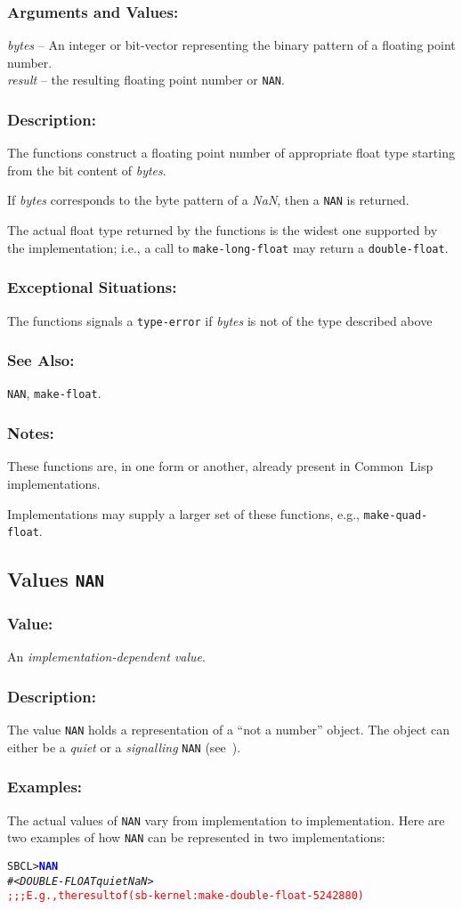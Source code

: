 \documentclass[10pt,fleqn]{article}
\newcommand{\CL}{\textsf{Common~Lisp}}
\newcommand{\code}[1]{\texttt{#1}}
\newcommand{\varname}[1]{\textit{#1}}
\newcommand{\codeprompt}[1]{\textcolor{blue}{\textbf{#1}}}
\newcommand{\DDictionaryItem}[1]{\vspace*{6pt}\noindent\hrulefill\vspace*{-9pt}\subsection*{#1}}
\newcommand{\DArgsNValues}{\subsubsection*{Arguments and Values:}}
\newcommand{\DDescription}{\subsubsection*{Description:}}
\newcommand{\DExamples}{\subsubsection*{Examples:}}
\newcommand{\DExceptional}{\subsubsection*{Exceptional Situations:}}
\newcommand{\DNotes}{\subsubsection*{Notes:}}
\newcommand{\DSeeAlso}{\subsubsection*{See Also:}}
\begin{document}
\DArgsNValues{}

\varname{bytes} -- An integer or bit-vector representing the binary
pattern of a floating point number.\\
\varname{result} -- the resulting floating point number or \code{NAN}.

\DDescription{}

The functions construct a floating point number of appropriate
float type starting from the bit content of
\varname{bytes}.

If \varname{bytes} corresponds to the byte pattern of a \emph{NaN},
then a \code{NAN} is returned.

The actual float type returned by the functions is the widest one
supported by the implementation; i.e., a call to
\code{make-long-float} may return a \code{double-float}.

\DExceptional{}

The functions signals a \code{type-error} if \varname{bytes} is not of
the type described above

\DSeeAlso{}

\code{NAN}, \code{make-float}.

\DNotes{}

These functions are, in one form or another, already present in \CL{}
implementations.

Implementations may supply a larger set of these functions, e.g.,
\code{make-quad-float}.


\DDictionaryItem{Values \code{NAN}}

\subsubsection*{Value:}

An \emph{implementation-dependent value}.


\DDescription{}

The value \code{NAN} holds a representation of a ``not a number''
object.  The object can either be a \emph{quiet} or a
\emph{signalling} \code{NAN} (see~\cite{2008:IEEE-754}).


\DExamples{}

The actual values of \code{NAN} vary from implementation to
implementation.  Here are two examples of how \code{NAN} can be
represented in two implementations:

\begin{alltt}
SBCL> \codeprompt{NAN}
\textit{#<DOUBLE-FLOAT quiet NaN>}
\textcolor{red}{;;; E.g., the result of (sb-kernel:make-double-float -524288 0)}
\end{alltt}
\end{document}
